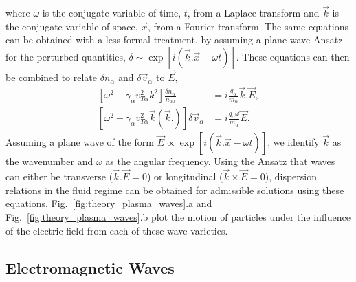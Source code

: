 where $\omega$ is the conjugate variable of time, $t$, from a Laplace transform and $\vec{k}$ is the conjugate variable of space, $\vec{x}$, from a Fourier transform.
The same equations can be obtained with a less formal treatment, by assuming a plane wave Ansatz for the perturbed quantities, $\delta\sim\exp{\left[ i\left( \vec{k}.\vec{x} - \omega t \right) \right]}$.
These equations can then be combined to relate $\delta n_\alpha$ and $\delta \vec{v}_\alpha$ to $\vec{E}$,
\begin{align}
    \label{eq:theory_wave2s_1}
    \left[ \omega^2 - \gamma_\alpha v_{T\alpha}^2 k^2 \right]\frac{\delta n_\alpha}{n_{\alpha 0}} &= i \frac{q_\alpha}{m_\alpha} \vec{k}.\vec{E},\\
    \label{eq:theory_wave2s_2}
    \left[ \omega^2 - \gamma_\alpha v_{T\alpha}^2 \vec{k}(\vec{k}.) \right]\delta \vec{v}_\alpha &= i \frac{q_\alpha \omega}{m_\alpha} \vec{E}.
\end{align}
Assuming a plane wave of the form $\vec{E}\propto \exp{\left[ i\left( \vec{k}.\vec{x} - \omega t \right) \right]}$, we identify $\vec{k}$ as the wavenumber and $\omega$ as the angular frequency.
Using the Ansatz that waves can either be transverse ($\vec{k}.\vec{E}=0$) or longitudinal ($\vec{k}\times\vec{E}=0$), dispersion relations in the fluid regime can be obtained for admissible solutions using these equations.
Fig.~\ref{fig:theory_plasma_waves}.a and Fig.~\ref{fig:theory_plasma_waves}.b plot the motion of particles under the influence of the electric field from each of these wave varieties.

\subsection{Electromagnetic Waves}%
\label{sec:theory_transwaves}

